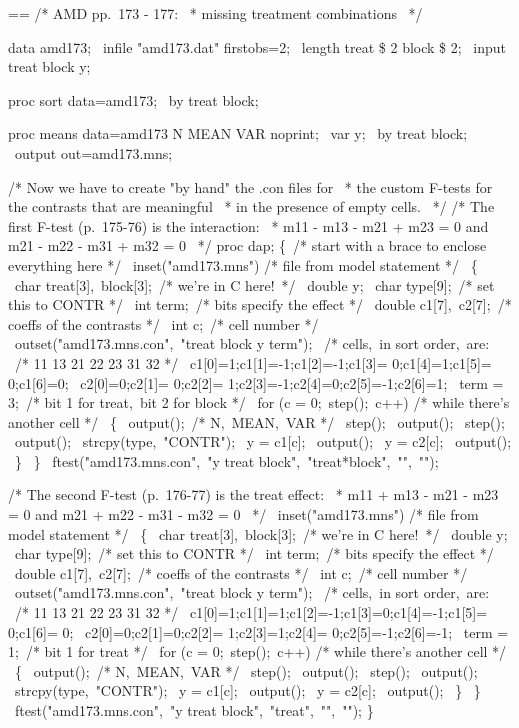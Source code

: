 \documentclass{book}
\makeatletter
\newenvironment{Texinfopreformatted}{%
  \par\GNUTobeylines\obeyspaces\frenchspacing\parskip=\z@\parindent=\z@}{}
{\catcode`\^^M=13 \gdef\GNUTobeylines{\catcode`\^^M=13 \def^^M{\null\par}}}
\newenvironment{Texinfoindented}{\begin{list}{}{}\item\relax}{\end{list}}
\renewcommand{\_}{\Texinfounderscore\discretionary{}{}{}}
\makeatother
\begin{document}
\begin{Texinfoindented}
\begin{Texinfopreformatted}%
\ttfamily 
/* AMD pp.\ 173 - 177:
\ * missing treatment combinations
\ */

data amd173;
\ infile "amd173.dat" firstobs=2;
\ length treat \$ 2 block \$ 2;
\ input treat block y;

proc sort data=amd173;
\ by treat block;

proc means data=amd173 N MEAN VAR noprint;
\ var y;
\ by treat block;
\ output out=amd173.mns;

/* Now we have to create "by hand" the .con files for
\ * the custom F-tests for the contrasts that are meaningful
\ * in the presence of empty cells.
\ */
/* The first F-test (p.\ 175-76) is the interaction:
\ * m11 - m13 - m21 + m23 = 0 and m21 - m22 - m31 + m32 = 0
\ */
proc dap;
\{\ /* start with a brace to enclose everything here */
\  inset("amd173.mns") /* file from model statement */
\   \{
\     char treat[3],\ block[3];\ /* we're in C here!\ */
\     double y;
\     char \_type\_[9];\ /* set this to CONTR */
\     int \_term\_;\     /* bits specify the effect */
\     double c1[7],\ c2[7];\ /* coeffs of the contrasts */
\     int c;\ /* cell number */
\     outset("amd173.mns.con",\ "treat block y \_term\_");
\     /* cells,\ in sort order,\ are:
\     /*   11       13       21       22      23       31      32 */
\     c1[0]=1;c1[1]=-1;c1[2]=-1;c1[3]= 0;c1[4]=1;c1[5]= 0;c1[6]=0;
\     c2[0]=0;c2[1]= 0;c2[2]= 1;c2[3]=-1;c2[4]=0;c2[5]=-1;c2[6]=1;
\     \_term\_ = 3;\ /* bit 1 for treat,\ bit 2 for block */
\     for (c = 0;\ step();\ c++) /* while there's another cell */
\      \{
\        output();\ /* N,\ MEAN,\ VAR */
\        step();
\        output();
\        step();
\        output();
\        strcpy(\_type\_,\ "CONTR");
\        y = c1[c];
\        output();
\        y = c2[c];
\        output();
\      \}
\   \}
\  ftest("amd173.mns.con",\ "y treat block",\ "treat*block",\ "",\ "");

/* The second F-test (p.\ 176-77) is the treat effect:
\ * m11 + m13 - m21 - m23 = 0 and m21 + m22 - m31 - m32 = 0
\ */
\  inset("amd173.mns") /* file from model statement */
\   \{
\     char treat[3],\ block[3];\ /* we're in C here!\ */
\     double y;
\     char \_type\_[9];\ /* set this to CONTR */
\     int \_term\_;\     /* bits specify the effect */
\     double c1[7],\ c2[7];\ /* coeffs of the contrasts */
\     int c;\ /* cell number */
\     outset("amd173.mns.con",\ "treat block y \_term\_");
\     /* cells,\ in sort order,\ are:
\     /*   11      13       21      22       23       31      32 */
\     c1[0]=1;c1[1]=1;c1[2]=-1;c1[3]=0;c1[4]=-1;c1[5]= 0;c1[6]= 0;
\     c2[0]=0;c2[1]=0;c2[2]= 1;c2[3]=1;c2[4]= 0;c2[5]=-1;c2[6]=-1;
\     \_term\_ = 1;\ /* bit 1 for treat */
\     for (c = 0;\ step();\ c++) /* while there's another cell */
\      \{
\        output();\ /* N,\ MEAN,\ VAR */
\        step();
\        output();
\        step();
\        output();
\        strcpy(\_type\_,\ "CONTR");
\        y = c1[c];
\        output();
\        y = c2[c];
\        output();
\      \}
\   \}
\  ftest("amd173.mns.con",\ "y treat block",\ "treat",\ "",\ "");
\}


\end{Texinfopreformatted}
\end{Texinfoindented}
\end{document}
